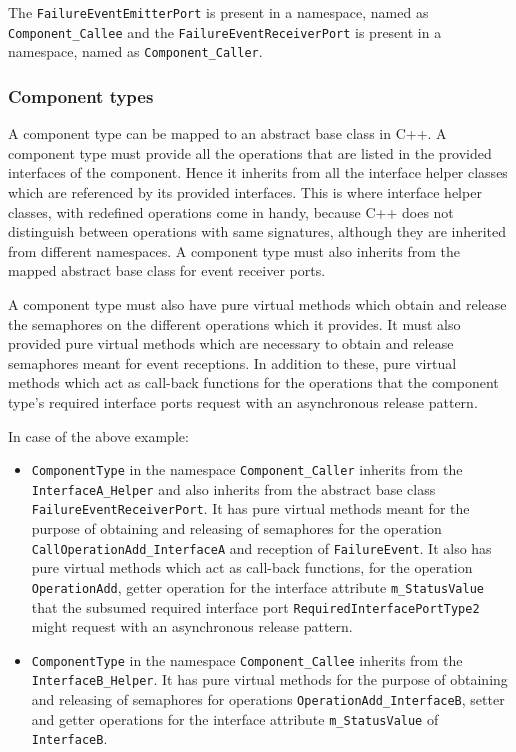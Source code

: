 The \texttt{FailureEvent\allowbreak EmitterPort} is present in a namespace, named as \texttt{Component\_Callee} and the \texttt{FailureEvent\texttt ReceiverPort} is present in a namespace, named as \texttt{Component\_Caller}.    

\subsubsection{\textbf{Component types}}
A component type can be mapped to an abstract base class in C++. A component type must provide all the operations that are listed in the provided interfaces of the component. Hence it inherits from all the interface helper classes which are referenced by its provided interfaces. This is where interface helper classes, with redefined operations come in handy, because C++ does not distinguish between operations with same signatures, although they are inherited from different namespaces. A component type must also inherits from the mapped abstract base class for event receiver ports.

A component type must also have pure virtual methods which obtain and release the semaphores on the different operations which it provides. It must also provided pure virtual methods which are necessary to obtain and release semaphores meant for event receptions. In addition to these, pure virtual methods which act as call-back functions for the operations that the component type's required interface ports request with an asynchronous release pattern.   

In case of the above example:
\begin{itemize}
\item \texttt{ComponentType} in the namespace \texttt{Component\_Caller} inherits from the \texttt{InterfaceA\allowbreak\_Helper} and also inherits from the abstract base class \texttt{FailureEvent\allowbreak ReceiverPort}. It has pure virtual methods meant for the purpose of obtaining and releasing of semaphores for the operation \texttt{CallOperationAdd\allowbreak\_InterfaceA} and reception of \texttt{FailureEvent}. It also has pure virtual methods which act as call-back functions, for the operation \texttt{OperationAdd}, getter operation for the interface attribute \texttt{m\_StatusValue} that the subsumed required interface port \texttt{RequiredInterfacePortType2} might request with an asynchronous release pattern.
\item \texttt{ComponentType} in the namespace \texttt{Component\_Callee} inherits from the \texttt{InterfaceB\allowbreak\_Helper}. It has pure virtual methods for the purpose of obtaining and releasing of semaphores for operations \texttt{OperationAdd\allowbreak\_InterfaceB}, setter and getter operations for the interface attribute \texttt{m\_StatusValue} of \texttt{InterfaceB}.  
\end{itemize}        

